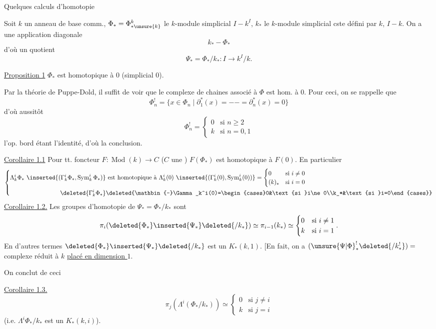 Quelques calculs d'homotopie

Soit $k$ un anneau de base comm.,
$\Phi_*=\Phi^k_{*\unsure{k}}$ le $k$-module simplicial $I\mathbin{-}k^I$,
$k_*$ le $k$-module simplicial cste défini par $k$, $I\mathbin{-}k$.
On a une application diagonale
\[k_*\mathbin{-}\Phi_*\]
d'où un quotient
\[\Psi_*=\Phi_*/k_*:I\longrightarrow k^I/k.\]

\uline{Proposition 1} $\Phi_*$ est homotopique à $0$ 
(simplicial $0$).

Par la théorie de Puppe-Dold, il suffit de voir que le complexe de chaines
\inserted{$\Phi_*^!$} associé \deleted{$\unsure{\Phi}$} à $\Phi$ est hom. à $0$.
Pour ceci, on se rappelle que
\[
\Phi_n^!=\{x\in\Phi_n\mid\partial_1^*(x)=- -=\partial_n^*(x)=0\}
\]
d'où aussitôt
\[
\Phi_n^!=\begin{cases}0&\text{si }n\geq2\\k&\text{si }n=0,1\end{cases}
\]
l'op.  bord
étant l'identité, d'où la conclusion.

\uline{Corollaire 1.1} Pour tt. foncteur $F:\operatorname{Mod}(k)\longrightarrow C$
($C$ une ) $F(\Phi_*)$ est homotopique à $F(0)$.
En particulier
\[
\left\{\begin{aligned}
\Lambda_k^i\Phi_*\ \inserted{(\Gamma_k^i\Phi_*,\operatorname{Sym}_k^i\Phi_*)}
&\text{ est homotopique à }\Lambda_k^i(0)\ \inserted{(\Gamma_k^i(0),\operatorname{Sym}_k^i(0))}
=\begin{cases}0&\text{si }i\ne0\\(k)_*&\text{si }i=0\end{cases}\\
\deleted{\Gamma_k^i\Phi_*}&\deleted{\mathbin{-}\Gamma_k^i(0)=\begin{cases}0&\text{si }i\ne0\\k_*&\text{si }i=0\end{cases}}
\end{aligned}\right.
\]
\uline{Corollaire 1.2.} Les groupes d'homotopie de $\Psi_*=\Phi_*/k_*$ sont
\[
\pi_i(\deleted{\Phi_*}\inserted{\Psi_*}\deleted{/k_*})
\simeq\pi_{i-1}(k_*)\simeq\begin{cases}0&\text{si }i\ne1\\k&\text{si }i=1\end{cases}.
\]
En d'autres termes $\deleted{\Phi_*}\inserted{\Psi_*}\deleted{/k_*}$ est un $K_*(k,1)$.
[En fait, on a $(\unsure{\Psi|\Phi}_*^!\deleted{/k_*^!})=$ complexe réduit à $k$ \uline{placé en dimension $1$}.

On conclut de ceci 

\uline{Corollaire 1.3.}
\[
\pi_j(\Lambda^i(\Phi_*/k_*))\simeq
\begin{cases}0&\text{si }j\ne i\\k&\text{si }j=i\end{cases}
\]
(i.e. $\Lambda^i\Phi_*/k_*$ est un $K_*(k,i)$).
